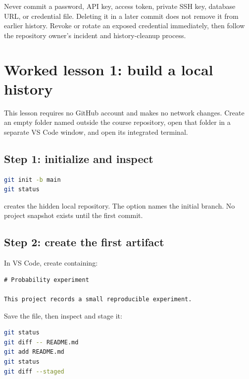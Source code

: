 \begin{warningbox}
Never commit a password, API key, access token, private SSH key, database URL, or
credential file. Deleting it in a later commit does not remove it from earlier
history. Revoke or rotate an exposed credential immediately, then follow the
repository owner's incident and history-cleanup process.
\end{warningbox}

\section{Worked lesson 1: build a local history}

This lesson requires no GitHub account and makes no network changes. Create an
empty folder named  outside the course repository, open that
folder in a separate VS Code window, and open its integrated terminal.

\subsection*{Step 1: initialize and inspect}

\begin{lstlisting}[language=bash,numbers=none]
git init -b main
git status
\end{lstlisting}

 creates the hidden local repository. The  option
names the initial branch. No project snapshot exists until the first commit.

\subsection*{Step 2: create the first artifact}

In VS Code, create  containing:

\begin{lstlisting}[numbers=none,commentstyle=\color{CodeComment}]
# Probability experiment

This project records a small reproducible experiment.
\end{lstlisting}

Save the file, then inspect and stage it:

\begin{lstlisting}[language=bash,numbers=none]
git status
git diff -- README.md
git add README.md
git status
git diff --staged
\end{lstlisting}

